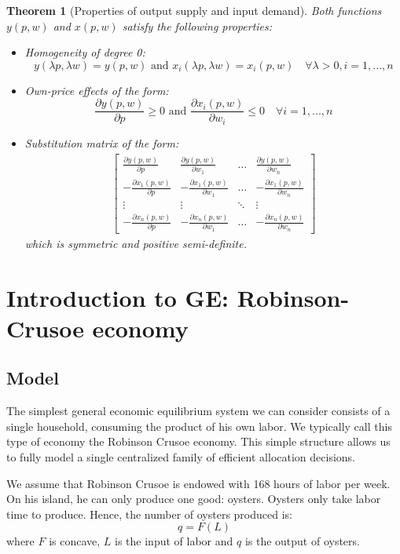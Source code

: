 \documentclass[12pt]{report}
\newtheorem{theorem}{Theorem}[chapter]
\begin{document}
\begin{theorem}[Properties of output supply and input demand]
Both functions $y(p,w)$ and $x(p,w)$ satisfy the following properties: \begin{itemize}
\item Homogeneity of degree 0: $$y(\lambda p, \lambda w) = y(p,w) \text{ and } x_i(\lambda p, \lambda w) = x_i(p,w) \quad \forall \lambda > 0, i = 1, ..., n $$
\item Own-price effects of the form: $$\frac{\partial y(p,w)}{\partial p} \geq 0 \text{ and } \frac{\partial x_i(p,w)}{\partial w_i} \leq 0 \quad \forall i = 1, ..., n $$
\item Substitution matrix of the form: \begin{align*}
\begin{bmatrix}
\frac{\partial y(p,w)}{\partial p} & \frac{\partial y(p,w)}{\partial w_1} & \hdots & \frac{\partial y(p,w)}{\partial w_n} \\
-\frac{\partial x_1(p,w)}{\partial p} & -\frac{\partial x_1(p,w)}{\partial w_1} & \hdots & -\frac{\partial x_1(p,w)}{\partial w_n} \\
\vdots & \vdots & \ddots & \vdots\\
-\frac{\partial x_n(p,w)}{\partial p} & -\frac{\partial x_n(p,w)}{\partial w_1} & \hdots & -\frac{\partial x_n(p,w)}{\partial w_n}
\end{bmatrix}
\end{align*} which is symmetric and positive semi-definite.
\end{itemize}
\end{theorem}

\chapter{Introduction to GE: Robinson-Crusoe economy}

\section{Model}

The simplest general economic equilibrium system we can consider consists of a single household, consuming the product of his own labor. We typically call this type of economy the Robinson Crusoe economy. This simple structure allows us to fully model a single centralized family of efficient allocation decisions.

We assume that Robinson Crusoe is endowed with 168 hours of labor per week. On his island, he can only produce one good: oysters. Oysters only take labor time to produce. Hence, the number of oysters produced is: $$ q = F(L) $$ where $F$ is concave, $L$ is the input of labor and $q$ is the output of oysters. 
\end{document}
